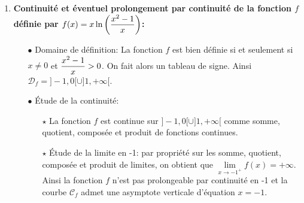\documentclass[a4paper, 11pt,reqno]{article}
\begin{document}
\begin{correction}
\begin{enumerate}
\begin{itemize}
			      \item[$\bullet$] \'Etude de la continuit\'e:
			            \begin{itemize}
				            \item[$\star$] La fonction $f$ est continue sur $\R^{+\star}$ comme compos\'ee, somme et quotient de fonctions continues.
				            \item[$\star$] \'Etude de la limite en 0: par l'\'equivalent usuel du cosinus et par substitution, on a: $1-\cos{(\sqrt{x})} \underset{0}{\thicksim} \ddp\frac{(\sqrt{x})^2}{2}$. Ainsi par quotient $f(x)\underset{0}{\thicksim} \ddp\demi$ car $|x|=x$ car on est sur $\R^{+\star}$. Ainsi $\lim\limits_{x\to 0} f(x)=\ddp\demi$. Ainsi la fonction $f$ est prolongeable par continuit\'e en 0 en posant $f(0)=\ddp\demi$.
			            \end{itemize}
		      \end{itemize}
		      On obtient alors une nouvelle fonction que l'on continue de noter $f$ qui est d\'efinie sur $\R^+$ par $f(x)=\left\lbrace \begin{array}{ll}  \ddp\frac{1-\cos{(\sqrt{x})}}{|x|}& \hbox{si}\ x>0,\vsec\\ \ddp\demi & \hbox{si}\ x=0  \end{array}\right.$ Cette fonction est alors bien continue sur $\R^+$ car elle est continue sur $\R^{+\star}$ comme compos\'ee, somme et quotient de fonctions continues et elle est continue en 0 par prolongement.
		\item \textbf{Continuit\'e et \'eventuel prolongement par continuit\'e de la fonction $f$ d\'efinie par $f(x)=x\ln{\left(  \displaystyle\frac{x^2-1}{x} \right)}$:}
		      \begin{itemize}
			      \item[$\bullet$] Domaine de d\'efinition: La fonction $f$ est bien d\'efinie si et seulement si $x\not= 0$ et $\displaystyle\frac{x^2-1}{x}>0$. On fait alors un tableau de signe. Ainsi $\mathcal{D}_{f}=\rbrack -1,0\lbrack\cup\rbrack 1,+\infty\lbrack$.
			      \item[$\bullet$] \'Etude de la continuit\'e:
			            \begin{itemize}
				            \item[$\star$] La fonction $f$ est continue sur $\rbrack -1,0\lbrack\cup\rbrack 1,+\infty\lbrack$ comme somme, quotient, compos\'ee et produit de fonctions continues.
				            \item[$\star$] \'Etude de la limite en -1: par propri\'et\'e sur les somme, quotient, compos\'ee et produit de limites, on obtient que $\lim\limits_{x\to -1^+} f(x)=+\infty$. Ainsi la fonction $f$ n'est pas prolongeable par continuit\'e en -1 et la courbe $\mathcal{C}_{f}$ admet une asymptote verticale d'\'equation $x=-1$.

\end{itemize}
\end{itemize}
\end{enumerate}
\end{correction}
\end{document}
